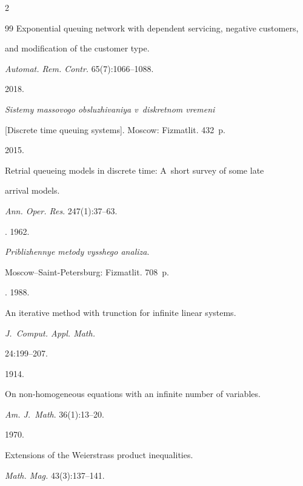 \begin{multicols}{2}
{{\begin{thebibliography}{99}
Exponential queuing network with dependent servicing, negative customers, 


and modification of the customer type.


\textit{Automat. Rem. Contr.} 65(7):1066--1088.







 2018.


\textit{Sistemy massovogo obsluzhivaniya v~diskretnom vremeni}


[Discrete time queuing systems]. Moscow: Fizmatlit. 432~p.







 2015.


Retrial queueing models in discrete time: A~short survey of some late 


arrival models.


\textit{Ann. Oper. Res}. 247(1):37--63.







. 1962.


\textit{Priblizhennye metody vysshego analiza}.


Moscow--Saint-Petersburg: Fizmatlit. 708~p. 







. 1988.


An iterative method with trunction for infinite linear systems. 


\textit{J.~Comput. Appl. Math.}


24:199--207.







 1914.


On non-homogeneous equations with an infinite number of variables.


\textit{Am. J.~Math}. 36(1):13--20.







 1970. 


Extensions of the Weierstrass product inequalities.


\textit{Math. Mag.} 43(3):137--141.


\end{thebibliography}





 }


 }





\end{multicols}
